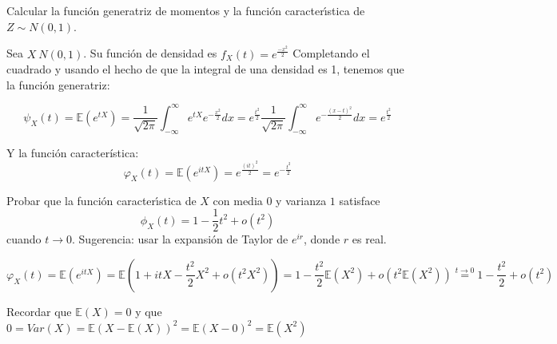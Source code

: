 
\begin{problem}[6]Calcular la funci\'on generatriz de momentos y la funci\'on caracter\'{\i}stica de $Z\sim N(0,1)$. 

\solution

Sea $X~N(0,1)$. Su función de densidad es $f_X(t)=e^{\frac{-x^2}{2}}$ Completando el cuadrado y usando el hecho de que la integral de una densidad es 1, tenemos que la función generatriz:

\[
\psi_X(t)=\mathbb{E}(e^{tX})=\frac{1}{\sqrt{2\pi}}\int_{-\infty}^{\infty}e^{tX}e^{-\frac{x^2}{2}}dx=e^{\frac{t^2}{2}}\frac{1}{\sqrt{2\pi}} \int_{-\infty}^{\infty}e^{-\frac{(x-t)^2}{2}} dx = e^{\frac{t^2}{2}}
\]

Y la función característica:
\[
\varphi_X(t)=\mathbb{E}(e^{itX})=e^{\frac{(it)^2}{2}}=e^{-\frac{t^2}{2}}
\]



\end{problem} 


\begin{problem}[7]Probar que la funci\'on caracter\'{\i}stica de $X$ con media 0 y varianza $1$
satisface
$$
\phi_X(t) = 1 - \frac{1}{2} t^2   + o(t^2)
$$ 
cuando $t\to 0$. Sugerencia: usar la expansi\'on de Taylor de $e^{ir}$, donde $r$ es real.


\solution


\[
\varphi_X(t)=\mathbb{E}(e^{itX})=\mathbb{E}(1+itX-\frac{t^2}{2}X^2+o(t^2X^2))=1-\frac{t^2}{2}\mathbb{E}(X^2)+o(t^2\mathbb{E}(X^2)) \stackrel{t \rightarrow 0}{=} 1-\frac{t^2}{2}+o(t^2)
\]

Recordar que $\mathbb{E}(X)=0$ y que $0=Var(X)=\mathbb{E}(X-\mathbb{E}(X))^2=\mathbb{E}(X-0)^2=\mathbb{E}(X^2)$

\end{problem}


